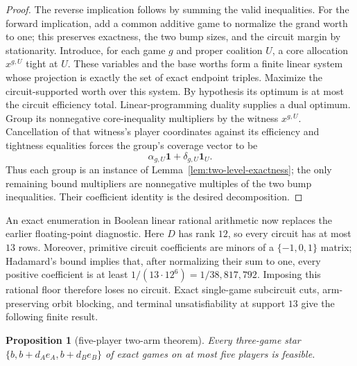 \documentclass[11pt]{article}
\newtheorem{proposition}[theorem]{Proposition}
\begin{document}
\begin{proof}
The reverse implication follows by summing the valid inequalities. For the
forward implication, add a common additive game to normalize the grand worth
to one; this preserves exactness, the two bump sizes, and the circuit margin
by stationarity. Introduce, for
each game $g$ and proper coalition $U$, a core allocation $x^{g,U}$ tight at
$U$. These variables and the base worths form a finite linear system whose
projection is exactly the set of exact endpoint triples. Maximize the
circuit-supported worth over this system. By hypothesis its optimum is at
most the circuit efficiency total. Linear-programming duality supplies a
dual optimum. Group its nonnegative core-inequality multipliers by the witness
$x^{g,U}$. Cancellation of that witness's player coordinates against its
efficiency and tightness equalities forces the group's coverage vector to be
\[
 \alpha_{g,U}\mathbf 1+\delta_{g,U}\mathbf 1_U.
\]
Thus each group is an instance of Lemma~\ref{lem:two-level-exactness}; the
only remaining bound multipliers are nonnegative multiples of the two bump
inequalities. Their coefficient identity is the desired decomposition.
\end{proof}

An exact enumeration in Boolean linear rational arithmetic now replaces the
earlier floating-point diagnostic.  Here $D$ has rank $12$, so every
circuit has at most $13$ rows.  Moreover, primitive circuit coefficients are
minors of a $\{-1,0,1\}$ matrix; Hadamard's bound implies that, after
normalizing their sum to one, every positive coefficient is at least
$1/(13\cdot12^6)=1/38{,}817{,}792$.  Imposing this rational floor therefore
loses no circuit. Exact single-game subcircuit cuts, arm-preserving orbit
blocking, and terminal unsatisfiability at support $13$ give the following
finite result.

\begin{proposition}[five-player two-arm theorem]
\label{prop:n5-two-arm}
Every three-game star $\{b,b+d_Ae_A,b+d_Be_B\}$ of exact games on at most
five players is feasible.
\end{proposition}
\end{document}
